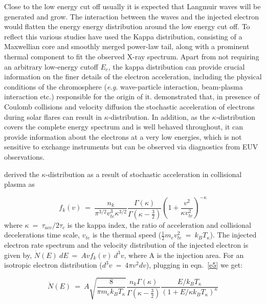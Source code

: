 Close to the low energy cut off usually it is expected that Langmuir waves will be generated and grow\citep{emslie84, hannah09}. The interaction between the waves and the injected electron would flatten the energy energy distribution around the low energy cut off. To reflect this various studies \citep{kasparova09, bataglia15, effenberger17} have used the Kappa distribution, consisting of a Maxwellian core and smoothly merged power-law tail, along with a prominent thermal component to fit the observed X-ray spectrum. Apart from not requiring an arbitrary low-energy cutoff $E_c$, the kappa distribution can provide crucial information on the finer details of the electron acceleration, including the physical conditions of the chromosphere ({\it e.g.} wave-particle interaction, beam-plasma interaction etc.) responsible for the origin of it. \cite{bian14, arnold21} demonstrated that, in presence of Coulomb collisions and velocity diffusion the stochastic acceleration of electrons during solar flares can result in $\kappa$-distribution. In addition, as the $\kappa$-distribution covers the complete energy spectrum and is well behaved throughout, it can provide information about the electrons at a very low energies, which is not sensitive to exchange instruments but can be observed via diagnostics from EUV observations.

\cite{bian14} derived the $\kappa$-distribution as a result of stochastic acceleration in collisional plasma as 

\begin{equation}\label{e5}
    f_k(v)~=~\frac{n_k}{\pi^{3/2}v_{te}^{3}\kappa^{3/2}}\frac{\Gamma(\kappa)}{\Gamma(\kappa-\frac{3}{2})}\left(1+\frac{v^{2}}{\kappa v_{te}^{2}}\right)^{-\kappa}
\end{equation}
\noindent where $\kappa~=~\tau_{acc}/2\tau_{c}$ is the kappa index, the ratio of acceleration and collisional decelerations time scale, $v_{te}$ is the thermal speed ($\frac{1}{2}m_ev_{te}^{2}~=~k_{B}T_{\kappa}$). The injected electron rate spectrum and the velocity distribution of the injected electron is given by, $\dot{N}(E)~dE~=~Avf_{k}(v)~d^{3}v$, where A is the injection area. For an isotropic electron distribution ($d^{3}v~=~4\pi v^{2}dv$), plugging in eqn.~\ref{e5} we get:

\begin{equation}\label{e6}
    \dot{N}(E)~=~A\sqrt{\frac{8}{\pi m_{e}k_{B}T_{\kappa}}}\frac{n_k \Gamma(\kappa)}{\Gamma(\kappa-\frac{3}{2})}\frac{E/k_{B}T_{\kappa}}{(1+E/\kappa k_{B}T_{\kappa})^{\kappa}}
\end{equation}

